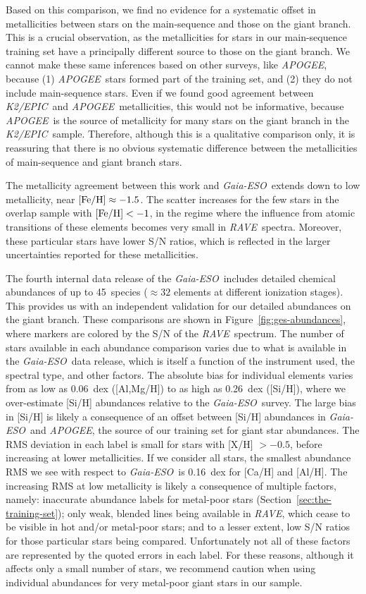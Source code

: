 \documentclass[preprint]{aastex}
\newcommand{\acronym}[1]{{\small{#1}}}
\newcommand{\project}[1]{\textsl{#1}}
\newcommand{\rave}{\project{\acronym{RAVE}}}
\newcommand{\ges}{\project{Gaia-ESO}}
\newcommand{\apogee}{\project{\acronym{APOGEE}}}
\newcommand{\epic}{\project{K2/EPIC}}
\begin{document}
Based on this comparison, we find no evidence for a systematic offset in
metallicities between stars on the main-sequence and those on the giant branch. 
This is a crucial observation, as the metallicities for stars in our 
main-sequence training set have a principally different source to those on 
the giant branch.  We cannot make these same inferences based on other 
surveys, like \apogee, because (1) \apogee\ stars formed part of the 
training set, and (2) they do not include main-sequence stars.  Even if we 
found good agreement between \epic\ and \apogee\ metallicities, this would 
not be informative, because \apogee\ is the source of metallicity for many 
stars on the giant branch in the \epic\ sample. Therefore, although this is
a qualitative comparison only, it is reassuring that there is no obvious 
systematic difference between the metallicities of main-sequence and giant
branch stars.


The metallicity agreement between this work and \ges\ extends down to low
metallicity, near $[{\rm Fe/H}] \approx -1.5$.  The scatter increases for
the few stars in the overlap sample with $[{\rm Fe/H}] < -1$, in the regime
where the influence from atomic transitions of these elements becomes very
small in \rave\ spectra. Moreover, these particular stars have lower S/N
ratios, which is reflected in the larger uncertainties
reported for these metallicities. 


The fourth internal data release of the \ges\ includes detailed chemical
abundances of up to 45~species ($\approx32$ elements at different ionization
stages).  This provides us with an independent validation for our detailed
abundances on the giant branch.  These comparisons are shown in 
Figure~\ref{fig:ges-abundances}, where markers are colored by the
S/N of the \rave\ spectrum.  The number of stars available in each abundance
comparison varies due to what is available in the \ges\ data release, which
is itself a function of the instrument used, the spectral type, and other
factors.  The absolute bias for individual elements varies from as low as
0.06~dex ([Al,Mg/H]) to as high as 0.26~dex ([Si/H]), where we over-estimate 
[Si/H] abundances relative to the \ges\ survey.  The large bias in [Si/H]
is likely a consequence of an offset between [Si/H] abundances in \ges\ and
\apogee, the source of our training set for giant star abundances.  
The RMS deviation in each label is small for stars with [X/H] $> -0.5$, 
before increasing at lower metallicities.  If we consider all stars, the 
smallest abundance RMS we see with respect to \ges\ is 0.16~dex for [Ca/H] 
and [Al/H].  The increasing RMS at low metallicity is likely a consequence
of multiple factors, namely: inaccurate abundance labels for metal-poor stars
(Section~\ref{sec:the-training-set}); only weak, blended lines being available
in \rave, which cease to be visible in hot and/or metal-poor stars; and to a 
lesser extent, low S/N ratios for those particular stars being compared.  
Unfortunately not all of these factors are represented by the quoted errors 
in each label.  For these reasons, although it affects only a small number of
stars, we recommend caution when using individual abundances for very 
metal-poor giant stars in our sample.
\end{document}
